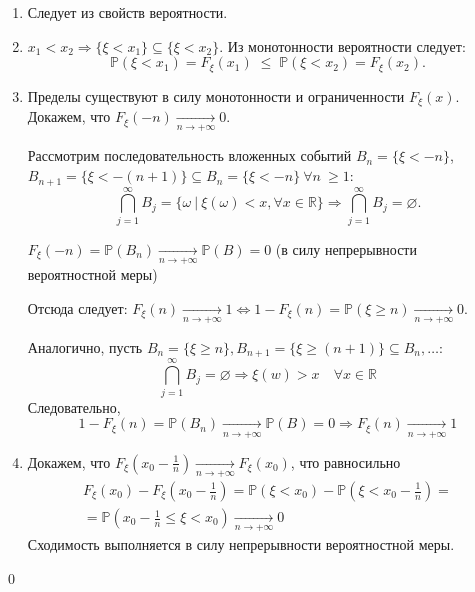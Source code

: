 \documentclass[oneside,final,14pt]{extreport}
\newcommand\myprob[1]{{\mathbb{P}(#1)}}
\renewenvironment{proof}{{\bfseries Доказательство.}}{\qed}
\theoremstyle{plain}
\theoremstyle{definition}
\theoremstyle{named}
\begin{document}
\begin{proof}
\begin{enumerate}
    \item Следует из свойств вероятности.
    \item 
        $x_1 < x_2 \Rightarrow \{\xi < x_1 \} \subseteq \{\xi < x_2\}$. Из монотонности вероятности следует:
        \begin{equation*}
            \myprob{\xi < x_1} = F_\xi(x_1) \; \leqslant \; \myprob{\xi < x_2} = F_\xi(x_2).
        \end{equation*}
    \item 
        Пределы существуют в силу монотонности и ограниченности $F_\xi(x)$. Докажем, что $F_\xi(-n) \xrightarrow[n \to +\infty]{} 0$.
        
        Рассмотрим последовательность вложенных событий $B_n = \{\xi < -n \}$, $B_{n+1} = \{\xi < -(n+1) \} \subseteq B_n = \{\xi < -n \} ~ \forall n ~ \geqslant 1$:
        \begin{equation*}
            \bigcap\limits_{j = 1}^{\infty}B_j = \{\omega ~|~ \xi(\omega) < x, \forall x \in \mathbb{R} \} \Rightarrow \bigcap\limits_{j = 1}^{\infty}B_j = \varnothing.
        \end{equation*}
    
        $F_\xi(-n) = \myprob{B_n} \xrightarrow[n \to +\infty]{} \myprob{B} = 0$ (в силу непрерывности вероятностной меры)
    
        Отсюда следует: $F_\xi(n) \xrightarrow[n \to +\infty]{} 1 \Leftrightarrow 1 - F_\xi(n) = \myprob{\xi \geqslant n} \xrightarrow[n \to +\infty]{} 0$.
    
        Аналогично, пусть $B_n = \{\xi \geqslant n\}, B_{n+1} = \{\xi \geqslant (n+1) \} \subseteq B_n, \ldots$:
        \begin{equation*}
            \bigcap\limits_{j = 1}^{\infty}B_j = \varnothing \Rightarrow \xi(w) > x \quad \forall x \in \mathbb{R}
        \end{equation*}
        Следовательно, 
        \begin{equation*}
            1 - F_\xi(n) = \myprob{B_n} \xrightarrow[n \to +\infty]{} \myprob{B} = 0 \Rightarrow F_\xi(n) \xrightarrow[n \to +\infty]{}1
        \end{equation*}
    \item
        Докажем, что $F_\xi(x_0 - \frac{1}{n}) \xrightarrow[n \to +\infty]{} F_\xi(x_0)$, что равносильно 
        \begin{multline*}
            F_\xi(x_0) - F_\xi \left(x_0 - \frac{1}{n} \right) 
            = \myprob{\xi < x_0} - \mathbb{P}\left( \xi < x_0 - \frac{1}{n} \right) = \\ 
            = \mathbb{P}\left( x_0 - \frac{1}{n} \leqslant \xi < x_0 \right) \xrightarrow[n \to +\infty]{} 0
                \end{multline*}
        Сходимость выполняется в силу непрерывности вероятностной меры.
\end{enumerate}
\end{proof}
\end{document}
